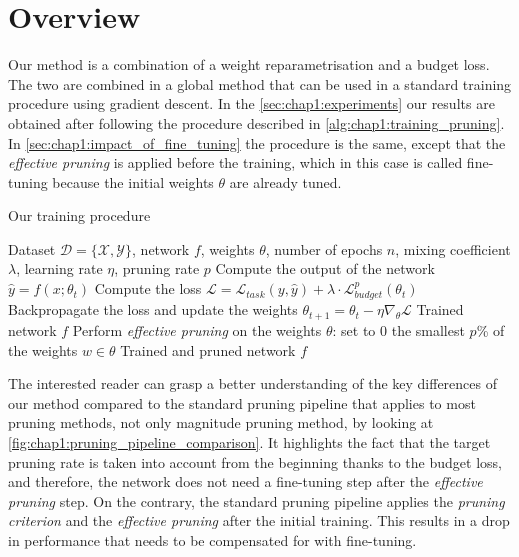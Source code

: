 
\section{Overview}
\label{sec:chap1:overview}
Our method is a combination of a weight reparametrisation and a budget loss. The
two are combined in a global method that can be used in a standard training
procedure using gradient descent. In the \cref{sec:chap1:experiments} our
results are obtained after following the procedure described in
\cref{alg:chap1:training_pruning}. In \cref{sec:chap1:impact_of_fine_tuning} the
procedure is the same, except that the \emph{effective pruning} is applied before the
training, which in this case is called fine-tuning because the initial weights
$\theta$ are already tuned.\\

\begin{algorithm}
  \caption{Our training procedure}
  \label{alg:chap1:training_pruning}
  \begin{algorithmic}
  \REQUIRE Dataset $\mathcal{D} = \{\mathcal{X}, \mathcal{Y}\}$, network $f$,
  weights $\theta$, number of epochs $n$, mixing coefficient $\lambda$, learning
  rate $\eta$, pruning rate $p$
          \STATE Compute the output of the network $\hat{y} = f(x; \theta_t)$
          \STATE Compute the loss $\mathcal{L}= \mathcal{L}_{task}(y, \hat{y}) + \lambda \cdot \mathcal{L}^{p}_{budget}(\theta_t)$
          \STATE Backpropagate the loss and update the weights $\theta_{t+1} = \theta_t - \eta \nabla_{\theta} \mathcal{L}$
      \ENDFOR
  \ENDFOR
  \RETURN Trained network $f$
  \STATE Perform \emph{effective pruning} on the weights $\theta$: set to 0 the
  smallest $p$\% of the weights $w\in\theta$
  \RETURN Trained and pruned network $f$
  \end{algorithmic}
  \end{algorithm}


The interested reader can grasp a better understanding of the key differences of
our method compared to the standard pruning pipeline that applies to most
pruning methods, not only magnitude pruning method, by looking at
\cref{fig:chap1:pruning_pipeline_comparison}. It highlights the fact that the
target pruning rate is taken into account from the beginning thanks to the budget
loss, and therefore, the network does not need a fine-tuning step after the
\emph{effective pruning} step. On the contrary, the standard pruning pipeline
applies the \emph{pruning criterion} and the \emph{effective pruning} after the
initial training. This results in a drop in performance that needs to be
compensated for with fine-tuning. \\

